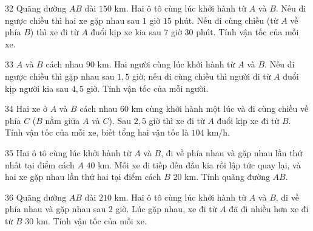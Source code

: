 \gap
\begin{probbox}{32}{}
Quãng đường $AB$ dài $150$ km. Hai ô tô cùng lúc khởi hành từ $A$ và $B$. Nếu đi ngược chiều thì hai xe gặp nhau sau $1$ giờ $15$ phút. Nếu đi cùng chiều (từ $A$ về phía $B$) thì xe đi từ $A$ đuổi kịp xe kia sau $7$ giờ $30$ phút. Tính vận tốc của mỗi xe.
\end{probbox}
\gap
\begin{probbox}{33}{}
$A$ và $B$ cách nhau $90$ km. Hai người cùng lúc khởi hành từ $A$ và $B$. Nếu đi ngược chiều thì gặp nhau sau $1{,}5$ giờ; nếu đi cùng chiều thì người đi từ $A$ đuổi kịp người kia sau $4{,}5$ giờ. Tính vận tốc của mỗi người.
\end{probbox}
\gap
\begin{probbox}{34}{}
Hai xe ở $A$ và $B$ cách nhau $60$ km cùng khởi hành một lúc và đi cùng chiều về phía $C$ ($B$ nằm giữa $A$ và $C$). Sau $2{,}5$ giờ thì xe đi từ $A$ đuổi kịp xe đi từ $B$. Tính vận tốc của mỗi xe, biết tổng hai vận tốc là $104$ km/h.
\end{probbox}
\gap
\begin{probbox}{35}{}
Hai ô tô cùng lúc khởi hành từ $A$ và $B$, đi về phía nhau và gặp nhau lần thứ nhất tại điểm cách $A$ $40$ km. Mỗi xe đi tiếp đến đầu kia rồi lập tức quay lại, và hai xe gặp nhau lần thứ hai tại điểm cách $B$ $20$ km. Tính quãng đường $AB$.
\end{probbox}
\gap
\begin{probbox}{36}{}
Quãng đường $AB$ dài $210$ km. Hai ô tô cùng lúc khởi hành từ $A$ và $B$, đi về phía nhau và gặp nhau sau $2$ giờ. Lúc gặp nhau, xe đi từ $A$ đã đi nhiều hơn xe đi từ $B$ $30$ km. Tính vận tốc của mỗi xe.
\end{probbox}
